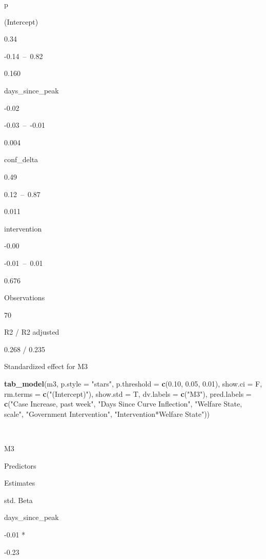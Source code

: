 \documentclass[
]{article}
\newenvironment{Shaded}{\begin{snugshade}}{\end{snugshade}}
\newcommand{\DataTypeTok}[1]{\textcolor[rgb]{0.13,0.29,0.53}{#1}}
\newcommand{\FloatTok}[1]{\textcolor[rgb]{0.00,0.00,0.81}{#1}}
\newcommand{\KeywordTok}[1]{\textcolor[rgb]{0.13,0.29,0.53}{\textbf{#1}}}
\newcommand{\NormalTok}[1]{#1}
\newcommand{\StringTok}[1]{\textcolor[rgb]{0.31,0.60,0.02}{#1}}
\begin{document}
p

(Intercept)

0.34

-0.14~--~0.82

0.160

days\_since\_peak

-0.02

-0.03~--~-0.01

0.004

conf\_delta

0.49

0.12~--~0.87

0.011

intervention

-0.00

-0.01~--~0.01

0.676

Observations

70

R2 / R2 adjusted

0.268 / 0.235

Standardized effect for M3

\begin{Shaded}
\begin{Highlighting}[]
\KeywordTok{tab_model}\NormalTok{(m3, }\DataTypeTok{p.style =} \StringTok{"stars"}\NormalTok{, }\DataTypeTok{p.threshold =} \KeywordTok{c}\NormalTok{(}\FloatTok{0.10}\NormalTok{, }\FloatTok{0.05}\NormalTok{, }\FloatTok{0.01}\NormalTok{), }\DataTypeTok{show.ci =}\NormalTok{ F, }\DataTypeTok{rm.terms =} \KeywordTok{c}\NormalTok{(}\StringTok{"(Intercept)"}\NormalTok{), }\DataTypeTok{show.std =}\NormalTok{ T, }\DataTypeTok{dv.labels =} \KeywordTok{c}\NormalTok{(}\StringTok{"M3"}\NormalTok{), }\DataTypeTok{pred.labels =} \KeywordTok{c}\NormalTok{(}\StringTok{"Case Increase, past week"}\NormalTok{, }\StringTok{"Days Since Curve Inflection"}\NormalTok{, }\StringTok{"Welfare State, scale"}\NormalTok{, }\StringTok{"Government Intervention"}\NormalTok{, }\StringTok{"Intervention*Welfare State"}\NormalTok{))}
\end{Highlighting}
\end{Shaded}

~

M3

Predictors

Estimates

std. Beta

days\_since\_peak

-0.01 *

-0.23
\end{document}
